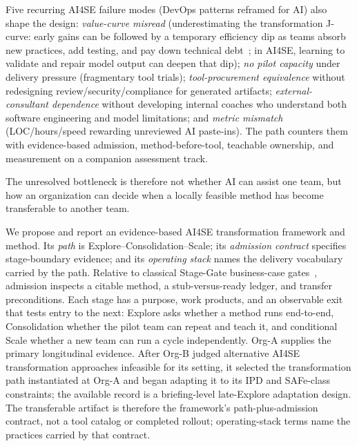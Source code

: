 \documentclass[10pt,conference]{IEEEtran}
\begin{document}
Five recurring AI4SE failure modes (DevOps patterns reframed for AI) also
shape the design:
\emph{value-curve misread} (underestimating the transformation J-curve:
early gains can be followed by a temporary efficiency dip as teams absorb new
practices, add testing, and pay down technical debt~\cite{DORA2018Accelerate};
in AI4SE, learning to validate and repair model output can deepen that dip);
\emph{no pilot capacity} under delivery pressure (fragmentary tool trials);
\emph{tool-procurement equivalence} without redesigning review/security/compliance
for generated artifacts;
\emph{external-consultant dependence} without developing internal coaches who
understand both software engineering and model limitations; and
\emph{metric mismatch} (LOC/hours/speed rewarding unreviewed AI paste-ins).
The path counters them with evidence-based admission, method-before-tool,
teachable ownership, and measurement on a companion assessment track.

The unresolved bottleneck is therefore not whether AI can assist one team, but
how an organization can decide when a locally feasible method has become
transferable to another team.

We propose and report an evidence-based AI4SE transformation framework and
method. Its \emph{path} is Explore--Consolidation--Scale; its
\emph{admission contract} specifies stage-boundary evidence; and its
\emph{operating stack} names the delivery vocabulary carried by the path.
Relative to classical Stage-Gate business-case gates~\cite{Cooper1990StageGate},
admission inspects a citable method, a stub-versus-ready ledger, and transfer
preconditions. Each stage has a purpose, work products, and an observable exit
that tests entry to the next: Explore asks whether a method runs end-to-end,
Consolidation whether the pilot team can repeat and teach it, and conditional
Scale whether a new team can run a cycle independently.
Org-A supplies the primary longitudinal evidence.  After Org-B judged
alternative AI4SE transformation approaches infeasible for its setting, it
selected the transformation path instantiated at Org-A and began adapting it
to its IPD and SAFe-class constraints; the available record is a
briefing-level late-Explore adaptation design.
The transferable artifact is therefore the framework's path-plus-admission
contract, not a tool catalog or completed rollout; operating-stack terms name
the practices carried by that contract.
\end{document}
